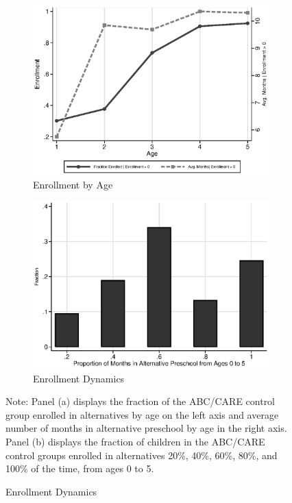 \begin{figure}
\centering
\caption{Control Substitution Characteristics, ABC/CARE Control Group}\label{fig:control-sub_a}
\begin{subfigure}[h]{0.49\textwidth}
	\centering
	\caption{Enrollment by Age} \label{fig:salmonella}
		\includegraphics[width=\textwidth]{output/abccare_Valtenrollment.eps}
\end{subfigure}
\begin{subfigure}[h]{0.49\textwidth}
		\centering
		\caption{Enrollment Dynamics} \label{fig:treatsubcare_2}
		\includegraphics[width=\textwidth]{output/abccare_Vfractimes.eps}
\end{subfigure}%
\footnotesize \justify
Note: Panel (a) displays the fraction of the ABC/CARE control group enrolled in alternatives by age on the left axis and average number of months in alternative preschool by age in the right axis. Panel (b) displays the fraction of children in the ABC/CARE control groups enrolled in alternatives 20\%, 40\%, 60\%, 80\%, and 100\% of the time, from ages 0 to 5.\\
\end{figure}



